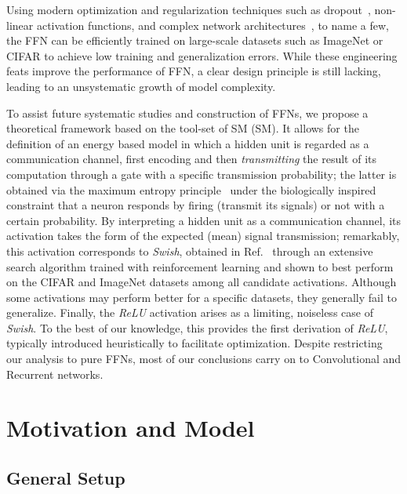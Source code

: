 \documentclass{article}
\begin{document}
Using modern optimization and regularization techniques such as dropout~\cite{srivastava2014}, non-linear activation functions, and complex network architectures~\cite{Krizhevsky}, to name a few, the FFN can be efficiently trained on large-scale datasets such as ImageNet or CIFAR to achieve low training and generalization errors.
While these engineering feats improve the performance of FFN, a clear design principle is still lacking, leading to an unsystematic growth of model complexity.

To assist future systematic studies and construction of FFNs, we propose a theoretical framework based on the tool-set of SM (SM). It allows for the definition of an energy based model in which a hidden unit is regarded as a communication channel, first encoding and then {\it transmitting} the result of its computation through a gate with a specific transmission probability;  the latter is obtained via the maximum entropy principle~\cite{zecchina, jaynes} under the biologically inspired constraint that a neuron responds by firing (transmit its signals) or not with a certain probability.
By interpreting a hidden unit as a communication channel, its activation takes the form of the expected (mean) signal transmission; remarkably, this activation corresponds to {\it Swish}, obtained in Ref.~\cite{elfwig, prajit} through an extensive search algorithm trained with reinforcement learning and shown to best perform on the CIFAR and ImageNet datasets among all candidate activations. Although some activations may perform better for a specific datasets, they generally fail to generalize. Finally, the {\it ReLU} activation arises as a limiting, noiseless case of {\it Swish}. To the best of our knowledge, this provides the first  derivation of {\it ReLU}, typically introduced heuristically to facilitate optimization. Despite restricting our analysis to pure FFNs, most of our conclusions carry on to Convolutional and Recurrent networks.

\section{Motivation and Model} \label{sec:model}

\subsection{General Setup} \label{sub:setup}
\end{document}
